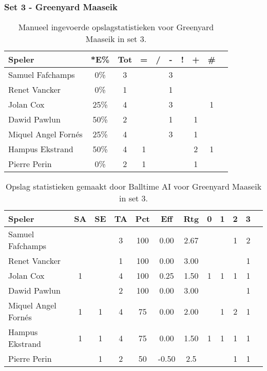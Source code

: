 \subsubsection{Set 3 - Greenyard Maaseik}
\label{sec:PL3_Greenyard3}


\begin{table}[ht!]
    \centering
    \scriptsize
    \begin{tabular}{|l|c|c|c|c|c|c|c|c|c|} \hline
        \textbf{Speler} & *E\% & Tot & = & / & - & ! & + & \#\\ \hline
        Samuel Fafchamps & 0\% & 3 &  &  & 3 &  &  &  \\ 
        Renet Vancker & 0\% & 1 &  &  & 1 &  &  & \\ 
        Jolan Cox & 25\% & 4 &  &  & 3 &  &  & 1 \\ 
        Dawid Pawlun & 50\% & 2 &  &  & 1 &  & 1 &  \\ 
        Miquel Angel Fornés & 25\% & 4 &  &  & 3 &  & 1 &  \\ 
        Hampus Ekstrand & 50\% & 4 & 1 &  &  &  & 2 & 1 \\ 
        Pierre Perin & 0\% & 2 & 1 &  &  &  & 1 &  \\ \hline
    \end{tabular}
    \caption[Manueel ingevoerde opslagstatistieken voor Greenyard Maaseik in set 3]{\label{tab:PL3ServeMaaseikMan3}Manueel ingevoerde opslagstatistieken voor Greenyard Maaseik in set 3.}
\end{table}

\begin{table}[ht!]
  \centering
  \scriptsize
  \begin{tabular}{|l|c|c|c|c|c|c|c|c|c|c|c|} \hline
    \textbf{Speler} & SA & SE & TA & Pct & Eff & Rtg & 0 & 1 & 2 & 3 \\ \hline
    Samuel Fafchamps &  &  & 3 & 100 & 0.00 & 2.67 &   &  & 1 & 2  \\
    Renet Vancker &  &  & 1 & 100 & 0.00 & 3.00 &  &  &  & 1 \\
    Jolan Cox & 1 &  & 4 & 100 & 0.25 & 1.50 & 1 & 1 & 1 & 1 \\
    Dawid Pawlun &  &  & 2 & 100 & 0.00 & 3.00 &   &   & & 1 \\
    Miquel Angel Fornés & 1 & 1 & 4 & 75 & 0.00 & 2.00 &   & 1 & 2 & 1 \\
    Hampus Ekstrand & 1 & 1 & 4 & 75 & 0.00 & 1.50 & 1 & 1 & 1 & 1\\
    Pierre Perin & & 1 & 2 & 50 & -0.50 & 2.5 &   &  & 1 & 1 \\ \hline
  \end{tabular}
  \caption[Opslagstatistieken gemaakt door Balltime AI voor Greenyard Maaseik in set 3]{\label{tab:PL3ServeMaaseikAI3}Opslag statistieken gemaakt door Balltime AI voor Greenyard Maaseik in set 3.}
\end{table}

